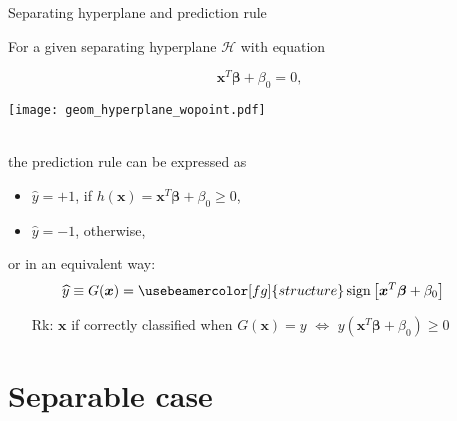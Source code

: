 \documentclass[compress, smaller, serif, 9pt]{beamer}
\newcommand{\structuretext}[1]{{\usebeamercolor[fg]{structure} #1}}
\DeclareMathOperator{\sign}{sign}
\begin{document}
\begin{frame}{Separating hyperplane and prediction rule}

 For a given separating {hyperplane} $\mathcal{H}$ with equation \medskip \\
  \begin{minipage}{.4\textwidth}
\begin{center}
                   $$
 \boldsymbol{x}^T \boldsymbol{\beta} + \beta_0 = 0, 
 $$
\end{center}
\end{minipage}
\quad
 \begin{minipage}{.3\textwidth}
  \begin{center}
   \texttt{[image: geom\_hyperplane\_wopoint.pdf]}
  \end{center}
 \end{minipage} \bigskip \\
 the \structuretext{prediction rule} can be expressed as
\begin{itemize}
 \item $\widehat{y}=+1$, if $h(\boldsymbol{x})= \boldsymbol{x}^T \boldsymbol{\beta} + \beta_0 \ge 0$,
 \item  $\widehat{y}=-1$, otherwise,
\end{itemize}
or in an equivalent way:
\begin{align*}
 \widehat{y} &\equiv G(\boldsymbol{x}) = \structuretext{ \sign{\left[  \boldsymbol{x}^T \boldsymbol{\beta} + \beta_0 \right]} }
\end{align*}

\begin{itemize}
 \item[Rk:] $\boldsymbol{x}$ if correctly classified when $G(\boldsymbol{x})=y$ $\Leftrightarrow$ 
 $y \left(  \boldsymbol{x}^T \boldsymbol{\beta} + \beta_0 \right )  \ge 0$
 \end{itemize}

\end{frame}



\section{Separable case}
\end{document}
